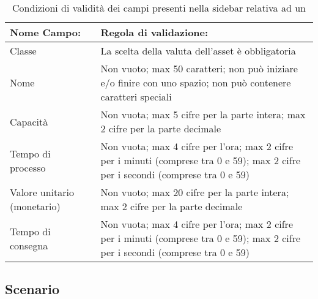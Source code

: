 		\begin{table}[H]
			\centering
			\begin{tabular}{ p{3cm}p{0cm}p{10.5cm}}
				\toprule
				\textbf{Nome Campo:} & & \textbf{Regola di validazione:} \\
				\midrule
				{Classe} & & {La scelta della valuta dell'asset è obbligatoria}
				\\ \hline
				{Nome} & & {Non vuoto; max 50 caratteri; non può iniziare e/o finire con uno spazio; non può contenere caratteri speciali} \\ \hline
				{Capacità} & &{Non vuota; max 5 cifre per la parte intera; max 2 cifre per la parte decimale} \\ \hline
				{Tempo di processo} & &{Non vuota; max 4 cifre per l'ora; max 2 cifre per i minuti (comprese tra 0 e 59); max 2 cifre per i secondi (comprese tra 0 e 59)} \\ \hline
				{Valore unitario (monetario)} & &{Non vuoto; max 20 cifre per la parte intera; max 2 cifre per la parte decimale} \\ \hline
				{Tempo di consegna} & &{Non vuota; max 4 cifre per l'ora; max 2 cifre per i minuti (comprese tra 0 e 59); max 2 cifre per i secondi (comprese tra 0 e 59)} \\ \hline
			\end{tabular}
			\caption{Condizioni di validità dei campi presenti nella sidebar relativa ad un  }
		\end{table}

	
	\subsection{Scenario}
	
